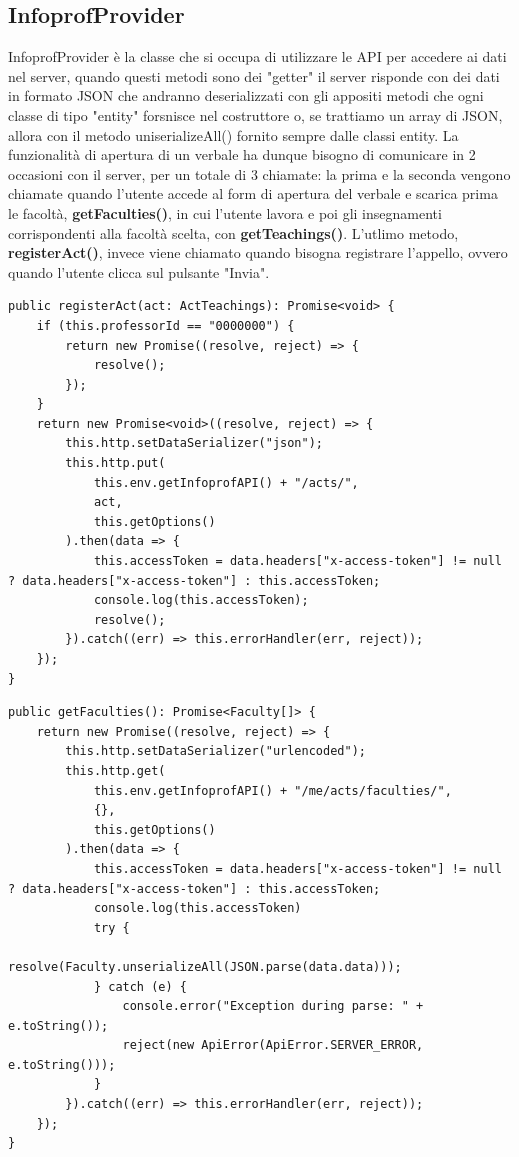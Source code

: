 \documentclass[Lau, oneside, noexaminfo]{sapthesis}%
\begin{document}
\subsection{InfoprofProvider}
InfoprofProvider è la classe che si occupa di utilizzare le API per accedere ai dati nel server, quando questi metodi sono dei "getter" il server risponde con dei dati in formato JSON che andranno deserializzati con gli appositi metodi che ogni classe di tipo "entity" forsnisce nel costruttore o, se trattiamo un array di JSON, allora con il metodo uniserializeAll() fornito sempre dalle classi entity. La funzionalità di apertura di un verbale ha dunque bisogno di comunicare in 2 occasioni con il server, per un totale di 3 chiamate: la prima e la seconda vengono chiamate quando l'utente accede al form di apertura del verbale e scarica prima le facoltà, \textbf{getFaculties()}, in cui l'utente lavora e poi gli insegnamenti corrispondenti alla facoltà scelta, con \textbf{getTeachings()}. L'utlimo metodo, \textbf{registerAct()}, invece viene chiamato quando bisogna registrare l'appello, ovvero quando l'utente clicca sul pulsante "Invia".

\begin{lstlisting}[frame=single]
public registerAct(act: ActTeachings): Promise<void> {
	if (this.professorId == "0000000") {
		return new Promise((resolve, reject) => {
			resolve();
		});
	}
	return new Promise<void>((resolve, reject) => {
		this.http.setDataSerializer("json");
		this.http.put(
			this.env.getInfoprofAPI() + "/acts/",
			act,
			this.getOptions()
		).then(data => {
			this.accessToken = data.headers["x-access-token"] != null ? data.headers["x-access-token"] : this.accessToken;
			console.log(this.accessToken);
			resolve();
		}).catch((err) => this.errorHandler(err, reject));
	});
}
\end{lstlisting}

\begin{lstlisting}[frame=single]
public getFaculties(): Promise<Faculty[]> {
	return new Promise((resolve, reject) => {
		this.http.setDataSerializer("urlencoded");
		this.http.get(
			this.env.getInfoprofAPI() + "/me/acts/faculties/",
			{},
			this.getOptions()
		).then(data => {
			this.accessToken = data.headers["x-access-token"] != null ? data.headers["x-access-token"] : this.accessToken;
			console.log(this.accessToken)
			try {
				resolve(Faculty.unserializeAll(JSON.parse(data.data)));
			} catch (e) {
				console.error("Exception during parse: " + e.toString());
				reject(new ApiError(ApiError.SERVER_ERROR, e.toString()));
			}
		}).catch((err) => this.errorHandler(err, reject));
	});
}
\end{lstlisting}
\end{document}
